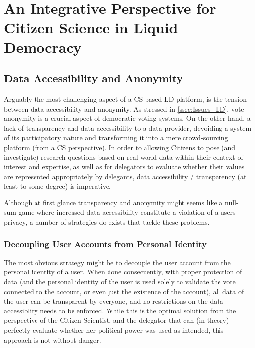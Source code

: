 \section[An Integrative Perspective for CS in LD]{An Integrative Perspective for Citizen Science in Liquid Democracy}
\label{sec:Integration_CSLD}

\subsection{Data Accessibility and Anonymity}
\label{ssec:Integration_AccessibilityAnonymity}
Arguably the most challenging aspect of a CS-based LD platform, is the tension between data accessibility and anonymity. As stressed  in \ref{ssec:Issues_LD}, vote anonymity is a crucial aspect of democratic voting systems. On the other hand, a lack of transparency and data accessibility  to a data provider, devoiding a system of its participatory nature and transforming it into a mere crowd-sourcing platform (from a CS perspective). In order to allowing Citizens to pose (and investigate) research questions based on real-world data within their context of interest and expertise, as well as for delegators to evaluate whether their values are represented appropriately by delegants, data accessibility / transparency (at least to some degree) is imperative.

Although at first glance transparency and anonymity might seems like a null-sum-game where increased data accessibility constitute a violation of a users privacy, a number of strategies do exists that tackle these problems.

\subsubsection{Decoupling User Accounts from Personal Identity}

The most obvious strategy might be to decouple the user account from the personal identity of a user. When done consecuently, with proper protection of data (and the personal identity of the user is used solely to validate the vote connected to the account, or even just the existence of the account), all data of the user can be transparent by everyone, and no restrictions on the data accessiblity needs to be enforced. While this is the optimal solution from the perspective of the Citizen Scientist, and the delegator that can (in theory) perfectly evaluate whether her political power was used as intended, this approach is not without danger.

